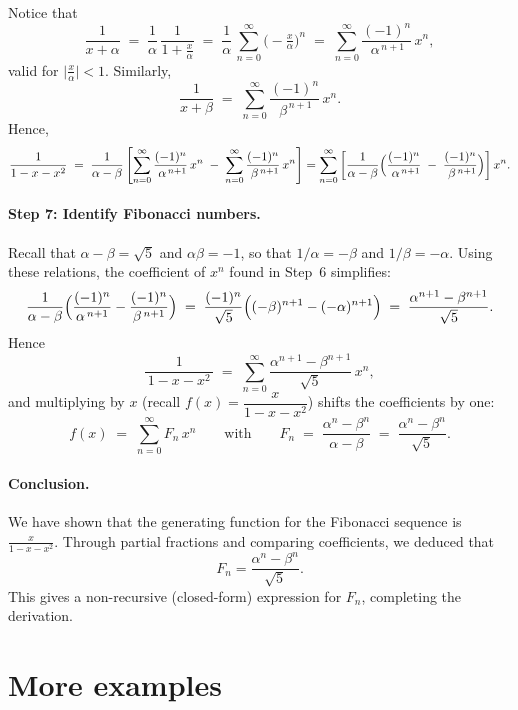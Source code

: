 \documentclass[docmute]{article}
\begin{document}
Notice that
\[
\frac{1}{x + \alpha}
\;=\;
\frac{1}{\alpha}\,\frac{1}{1 + \tfrac{x}{\alpha}}
\;=\;
\frac{1}{\alpha}\,\sum_{n=0}^\infty \bigl(-\tfrac{x}{\alpha}\bigr)^{n}
\;=\;
\sum_{n=0}^\infty
\frac{(-1)^n}{\,\alpha^{\,n+1}\!}\,
x^n,
\]
valid for \(\bigl|\tfrac{x}{\alpha}\bigr| < 1\).  Similarly,
\[
\frac{1}{x + \beta}
\;=\;
\sum_{n=0}^\infty
\frac{(-1)^n}{\,\beta^{\,n+1}\!}\,
x^n.
\]
Hence,
\[
\frac{1}{1 - x - x^2}
\;=\;
\frac{1}{\alpha - \beta}
\left[
\sum_{n=0}^\infty \frac{(-1)^n}{\,\alpha^{\,n+1}\!}\,x^n
\;-\;
\sum_{n=0}^\infty \frac{(-1)^n}{\,\beta^{\,n+1}\!}\,x^n
\right]
=
\sum_{n=0}^\infty
\left[
\frac{1}{\alpha - \beta}
\Bigl(
\frac{(-1)^n}{\,\alpha^{\,n+1}\!}
\;-\;
\frac{(-1)^n}{\,\beta^{\,n+1}\!}
\Bigr)
\right]
x^n.
\]

\paragraph{Step 7: Identify Fibonacci numbers.}

Recall that \(\alpha - \beta = \sqrt{5}\) and \(\alpha\beta = -1\), so that \(1/\alpha = -\beta\) and \(1/\beta = -\alpha\).  Using these relations, the coefficient of \(x^n\) found in Step~6 simplifies:
\[
\frac{1}{\alpha - \beta}
\Bigl(
\frac{(-1)^n}{\alpha^{\,n+1}}
-
\frac{(-1)^n}{\beta^{\,n+1}}
\Bigr)
\;=\;
\frac{(-1)^n}{\sqrt{5}}
\Bigl(
(-\beta)^{n+1} - (-\alpha)^{n+1}
\Bigr)
\;=\;
\frac{\alpha^{n+1} - \beta^{n+1}}{\sqrt{5}}.
\]
Hence
\[
\frac{1}{\,1 - x - x^2\,}
\;=\;
\sum_{n=0}^\infty \frac{\alpha^{n+1} - \beta^{n+1}}{\sqrt{5}}\, x^n ,
\]
and multiplying by \(x\) (recall \(f(x) = \dfrac{x}{1-x-x^2}\)) shifts the coefficients by one:
\[
f(x)
\;=\;
\sum_{n=0}^\infty F_n \, x^n
\qquad\text{with}\qquad
F_n
\;=\;
\frac{\alpha^n - \beta^n}{\,\alpha - \beta\,}
\;=\;
\frac{\alpha^n - \beta^n}{\,\sqrt{5}\,}.
\]

\paragraph{Conclusion.}
We have shown that the generating function for the Fibonacci sequence is 
\(\tfrac{x}{1 - x - x^2}\).  
Through partial fractions and comparing coefficients, we deduced that
\[
F_n = \frac{\alpha^n - \beta^n}{\sqrt{5}}.
\]
This gives a non-recursive (closed-form) expression for \(F_n\), completing the derivation.

\section{More examples}
\end{document}
